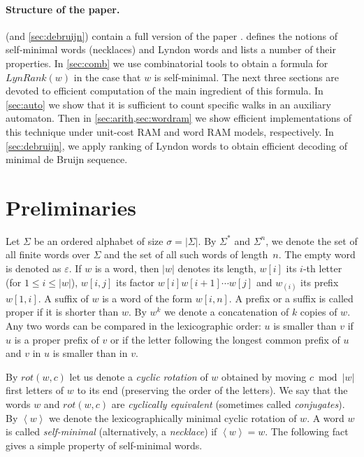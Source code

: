 \documentclass{article}
\newcommand{\Lynd}{\mathit{LynRank}}
\newcommand{\rot}{\mathit{rot}}
\newcommand{\minrot}[1]{\left\langle #1 \right\rangle}
\theoremstyle{definition}
\theoremstyle{remark}
\begin{document}
\paragraph{\bf Structure of the paper.}
 (and \ref{sec:debruijn}) contain a full version of the paper \cite{DBLP:conf/cpm/KociumakaRR14}.
 defines the notions of self-minimal words (necklaces) and Lyndon words and lists a number of their properties.
In \cref{sec:comb} we use combinatorial tools to obtain a formula for $\Lynd(w)$ in the case that $w$ is self-minimal.
The next three sections are devoted to efficient computation of the main ingredient of this formula.
In \cref{sec:auto} we show that it is sufficient to count specific walks in an auxiliary automaton.
Then in \cref{sec:arith,sec:wordram} we show efficient implementations of this technique under unit-cost RAM
and word RAM models, respectively.
In \cref{sec:debruijn}, we apply ranking of Lyndon words to obtain efficient decoding of minimal de Bruijn sequence.


\section{Preliminaries}\label{sec:prelim}
Let $\Sigma$ be an ordered alphabet of size $\sigma=|\Sigma|$.
By $\Sigma^*$ and $\Sigma^n$, we denote the set of all finite words over $\Sigma$ and the set of all such words of length~$n$.
The empty word is denoted as $\varepsilon$.
If $w$ is a word, then $|w|$ denotes its length, $w[i]$ its $i$-th letter
(for $1 \le i \le |w|$), $w[i,j]$ its factor $w[i] w[i+1] \cdots w[j]$
and $w_{(i)}$ its prefix $w[1,i]$.
A suffix of $w$ is a word of the form $w[i,n]$.
A prefix or a suffix is called proper if it is shorter than $w$.
By $w^k$ we denote a concatenation of $k$ copies of $w$.
Any two words can be compared in the lexicographic order:
$u$ is smaller than $v$ if $u$ is a proper prefix of $v$ or if the letter following the longest common prefix
of $u$ and $v$ in $u$ is smaller than in $v$.

By $\rot(w,c)$ let us denote a \emph{cyclic rotation} of $w$
obtained by moving $c \bmod{|w|}$ first letters of $w$ to its end (preserving the order of the letters).
We say that the words $w$ and $\rot(w,c)$ are \emph{cyclically equivalent}
(sometimes called \emph{conjugates}).
By $\minrot{w}$ we denote the lexicographically minimal cyclic rotation of $w$.
A word $w$ is called \emph{self-minimal} (alternatively, a \emph{necklace}) if $\minrot{w}=w$.
The following fact gives a simple property of self-minimal words.
\end{document}
